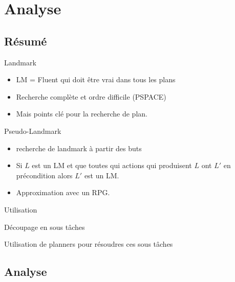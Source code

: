 \section{Analyse}
  \subsection*{Résumé}

\begin{frame}
  \begin{block}{Landmark}
    \begin{itemize}
      \item LM = Fluent qui doit être vrai dans tous les plans
      \item Recherche complète et ordre difficile (PSPACE)
      \item Mais points clé pour la recherche de plan.
    \end{itemize}
  \end{block}

  \begin{block}{Pseudo-Landmark}
    \begin{itemize}
      \item recherche de landmark à partir des buts
      \item Si $L$ est un LM et que toutes qui actions qui produisent $L$ ont $L'$ en précondition alors $L'$ est un LM.
      \item Approximation avec un RPG.
    \end{itemize}
  \end{block}
\end{frame}

\begin{frame}
  \begin{block}{Utilisation}
    \item Découpage en sous tâches
    \item Utilisation de planners pour résoudres ces sous tâches
  \end{block}
\end{frame}

  \subsection*{Analyse}

